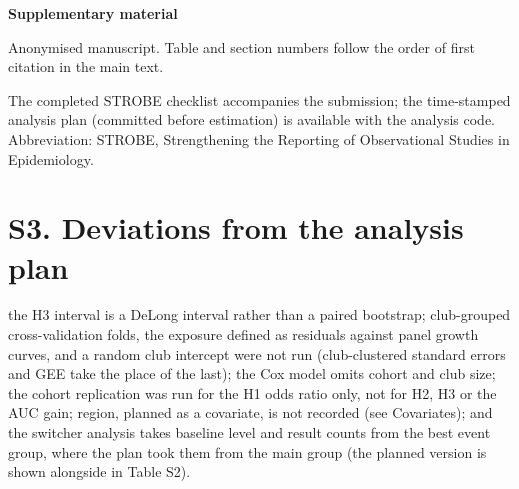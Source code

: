 \documentclass[12pt,a4paper]{article}
\begin{document}
\noindent\textbf{Supplementary material}

\bigskip
{}

\medskip
\noindent Anonymised manuscript. Table and section numbers follow the order of first citation in the main text.

\begin{table}[H]
\centering
\caption*{\textbf{Table S1.} Sample flow.}
\small

\vspace{0.2em}
\parbox{0.8\textwidth}{\footnotesize The completed STROBE checklist accompanies the submission; the time-stamped analysis plan (committed before estimation) is available with the analysis code. Abbreviation: STROBE, Strengthening the Reporting of Observational Studies in Epidemiology.}
\end{table}

\begin{table}[H]
\centering
\caption*{\textbf{Table S2.} Robustness of the progression--retention association. OR (95\,\% CI) per SD of the exposure named (per 100 points for the earlier level given the later level); outcome is senior activity unless stated. Abbreviations: CI, confidence interval; COVID-19, coronavirus disease 2019; GEE, generalised estimating equations; OR, odds ratio; SD, standard deviation; SE, standard error.}

\small

\end{table}


\section*{S3. Deviations from the analysis plan}

\noindent the H3 interval is a DeLong interval rather than a paired bootstrap; club-grouped cross-validation folds, the exposure defined as residuals against panel growth curves, and a random club intercept were not run (club-clustered standard errors and GEE take the place of the last); the Cox model omits cohort and club size; the cohort replication was run for the H1 odds ratio only, not for H2, H3 or the AUC gain; region, planned as a covariate, is not recorded (see Covariates); and the switcher analysis takes baseline level and result counts from the best event group, where the plan took them from the main group (the planned version is shown alongside in Table S2).

\printbibliography[heading=none]
\end{document}

